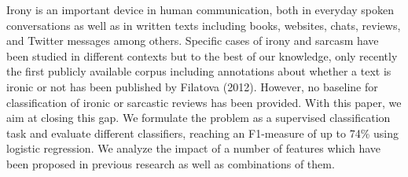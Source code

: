Irony is an important device in human communication, both in everyday spoken conversations as well as in written texts including books, websites, chats, reviews, and Twitter messages among others. Specific cases of irony and sarcasm have been studied in different contexts but to the best of our knowledge, only recently the first publicly available corpus including annotations about whether a text is ironic or not has been published by Filatova (2012). However, no baseline for classification of ironic or sarcastic reviews has been provided. With this paper, we aim at closing this gap. We formulate the problem as a supervised classification task and evaluate different classifiers, reaching an F1-measure of up to 74\% using logistic regression. We analyze the impact of a number of features which have been proposed in previous research as well as combinations of them.
